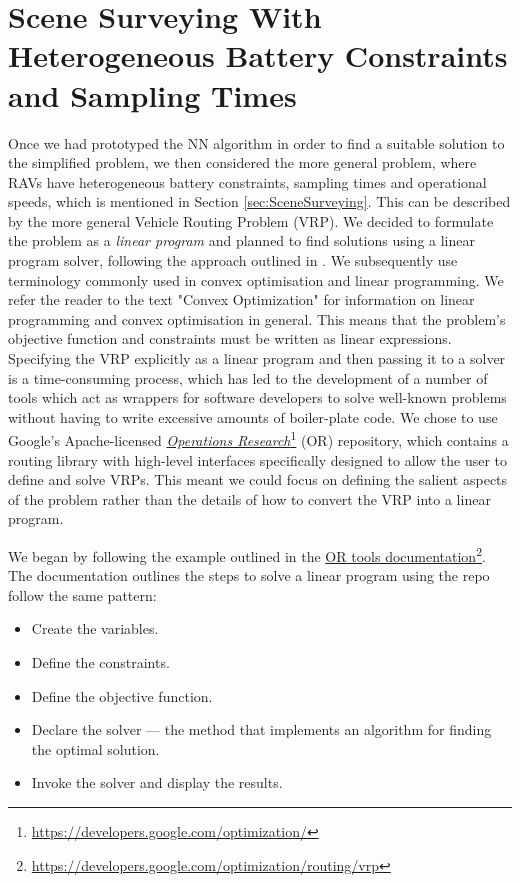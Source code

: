 \section{Scene Surveying With Heterogeneous Battery Constraints and Sampling Times}\label{sec:SceneSurveyingBatteryConstraints}

Once we had prototyped the NN algorithm in order to find a suitable solution to the simplified problem, we then considered the more general problem, where RAVs have heterogeneous battery constraints, sampling times and operational speeds, which is mentioned in Section \ref{sec:SceneSurveying}. This can be described by the more general Vehicle Routing Problem (VRP). We decided to formulate the problem as a \textit{linear program} and planned to find solutions using a linear program solver, following the approach outlined in \cite{Toth2002TheProblem}. We subsequently use terminology commonly used in convex optimisation and linear programming. We refer the reader to the text "Convex Optimization" \cite{Boyd2004ConvexOptimization} for information on linear programming and convex optimisation in general. This means that the problem's objective function and constraints must be written as linear expressions.
Specifying the VRP explicitly as a linear program and then passing it to a solver is a time-consuming process, which has led to the development of a number of tools which act as wrappers for software developers to solve well-known problems without having to write excessive amounts of boiler-plate code. We chose to use Google's Apache-licensed \href{https://developers.google.com/optimization/}{\textit{Operations Research}}\footnote{\href {https://developers.google.com/optimization/}{https://developers.google.com/optimization/}} (OR) repository, which contains a routing library with high-level interfaces specifically designed to allow the user to define and solve VRPs. This meant we could focus on defining the salient aspects of the problem rather than the details of how to convert the VRP into a linear program.

We began by following the example outlined in the \href{https://developers.google.com/optimization/routing/vrp}{OR tools documentation}\footnote{\href {https://developers.google.com/optimization/routing/vrp}{https://developers.google.com/optimization/routing/vrp}}. The documentation outlines the steps to solve a linear program using the repo follow the same pattern: 
\begin{itemize}
\item Create the variables.
\item Define the constraints.
\item Define the objective function.
\item Declare the solver — the method that implements an algorithm for finding the optimal solution.
\item Invoke the solver and display the results.
\end{itemize}


